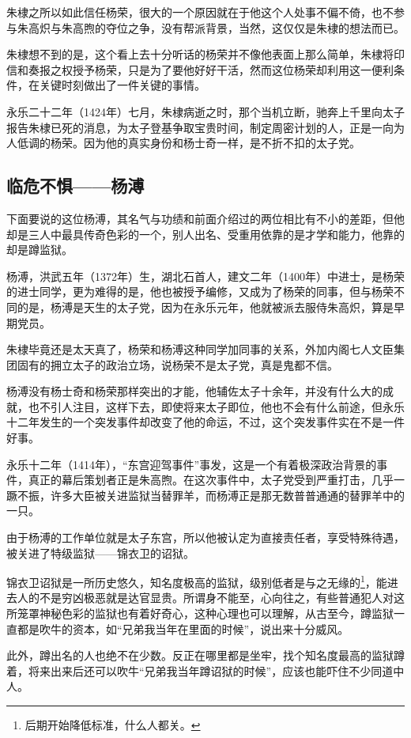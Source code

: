 \begin{multicols}{\theparacolNo}
朱棣之所以如此信任杨荣，很大的一个原因就在于他这个人处事不偏不倚，也不参与朱高炽与朱高煦的夺位之争，没有帮派背景，当然，这仅仅是朱棣的想法而已。

朱棣想不到的是，这个看上去十分听话的杨荣并不像他表面上那么简单，朱棣将印信和奏报之权授予杨荣，只是为了要他好好干活，然而这位杨荣却利用这一便利条件，在关键时刻做出了一件关键的事情。

永乐二十二年（1424年）七月，朱棣病逝之时，那个当机立断，驰奔上千里向太子报告朱棣已死的消息，为太子登基争取宝贵时间，制定周密计划的人，正是一向为人低调的杨荣。因为他的真实身份和杨士奇一样，是不折不扣的太子党。

\subsection{临危不惧——杨溥}
下面要说的这位杨溥，其名气与功绩和前面介绍过的两位相比有不小的差距，但他却是三人中最具传奇色彩的一个，别人出名、受重用依靠的是才学和能力，他靠的却是蹲监狱。

杨溥，洪武五年（1372年）生，湖北石首人，建文二年（1400年）中进士，是杨荣的进士同学，更为难得的是，他也被授予编修，又成为了杨荣的同事，但与杨荣不同的是，杨溥是天生的太子党，因为在永乐元年，他就被派去服侍朱高炽，算是早期党员。

朱棣毕竟还是太天真了，杨荣和杨溥这种同学加同事的关系，外加内阁七人文臣集团固有的拥立太子的政治立场，说杨荣不是太子党，真是鬼都不信。

杨溥没有杨士奇和杨荣那样突出的才能，他辅佐太子十余年，并没有什么大的成就，也不引人注目，这样下去，即使将来太子即位，他也不会有什么前途，但永乐十二年发生的一个突发事件却改变了他的命运，不过，这个突发事件实在不是一件好事。

永乐十二年（1414年），“东宫迎驾事件”事发，这是一个有着极深政治背景的事件，真正的幕后策划者正是朱高煦。在这次事件中，太子党受到严重打击，几乎一蹶不振，许多大臣被关进监狱当替罪羊，而杨溥正是那无数普普通通的替罪羊中的一只。

由于杨溥的工作单位就是太子东宫，所以他被认定为直接责任者，享受特殊待遇，被关进了特级监狱——锦衣卫的诏狱。

锦衣卫诏狱是一所历史悠久，知名度极高的监狱，级别低者是与之无缘的\footnote{后期开始降低标准，什么人都关。}，能进去人的不是穷凶极恶就是达官显贵。所谓身不能至，心向往之，有些普通犯人对这所笼罩神秘色彩的监狱也有着好奇心，这种心理也可以理解，从古至今，蹲监狱一直都是吹牛的资本，如“兄弟我当年在里面的时候”，说出来十分威风。

此外，蹲出名的人也绝不在少数。反正在哪里都是坐牢，找个知名度最高的监狱蹲着，将来出来后还可以吹牛“兄弟我当年蹲诏狱的时候”，应该也能吓住不少同道中人。


\end{multicols}
